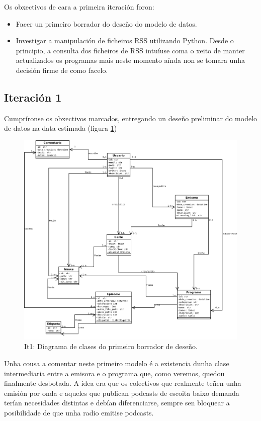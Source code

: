 Os obxectivos de cara a primeira iteración foron:

\begin{itemize}
	\item Facer un primeiro borrador do deseño do modelo de datos.
	\item Investigar a manipulación de ficheiros RSS utilizando Python. Desde o principio, a consulta dos ficheiros de RSS intuíuse coma o xeito de manter actualizados os programas mais neste momento aínda non se tomara unha decisión firme de como facelo.
\end{itemize}

\subsection{Iteración 1}

Cumpríronse os obxectivos marcados, entregando un deseño preliminar do modelo de datos na data estimada (figura \ref{fig:classold}) 

\begin{figure}[h]
	\centering
	\includegraphics[scale=0.35,keepaspectratio=true]{./images/class_diagram_20171107.png}
	\caption{It1: Diagrama de clases do primeiro borrador de deseño.}
	\label{fig:classold}
\end{figure}

Unha cousa a comentar neste primeiro modelo é a existencia dunha clase  intermediaria entre a emisora e o programa que, como veremos, quedou finalmente desbotada. A idea era que os colectivos que realmente teñen unha emisión por onda e aqueles que publican podcasts de escoita baixo demanda terían necesidades distintas e debían diferenciarse, sempre sen bloquear a posibilidade de que unha radio emitise podcasts.

